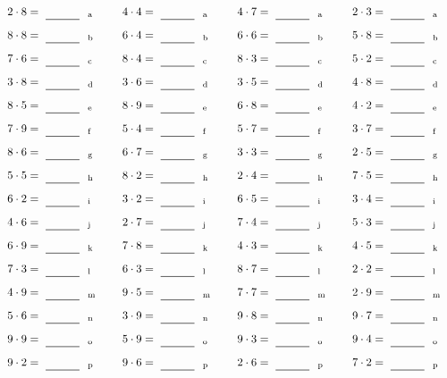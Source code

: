 \documentclass
[
  draft    = true,
  fontsize = 11pt,
  parskip  = half-
]
{scrartcl}
\begin{document}
\par\vfill\par
\begin{align*}
    \pline{2\cdot8}&=\rline{a}
  & \pline{4\cdot4}&=\rline{a}
  & \pline{4\cdot7}&=\rline{a}
  & \pline{2\cdot3}&=\rline{a} \\[1ex]
    \pline{8\cdot8}&=\rline{b}
  & \pline{6\cdot4}&=\rline{b}
  & \pline{6\cdot6}&=\rline{b}
  & \pline{5\cdot8}&=\rline{b} \\[1ex]
    \pline{7\cdot6}&=\rline{c}
  & \pline{8\cdot4}&=\rline{c}
  & \pline{8\cdot3}&=\rline{c}
  & \pline{5\cdot2}&=\rline{c} \\[1ex]
    \pline{3\cdot8}&=\rline{d}
  & \pline{3\cdot6}&=\rline{d}
  & \pline{3\cdot5}&=\rline{d}
  & \pline{4\cdot8}&=\rline{d} \\[1ex]
    \pline{8\cdot5}&=\rline{e}
  & \pline{8\cdot9}&=\rline{e}
  & \pline{6\cdot8}&=\rline{e}
  & \pline{4\cdot2}&=\rline{e} \\[1ex]
    \pline{7\cdot9}&=\rline{f}
  & \pline{5\cdot4}&=\rline{f}
  & \pline{5\cdot7}&=\rline{f}
  & \pline{3\cdot7}&=\rline{f} \\[1ex]
    \pline{8\cdot6}&=\rline{g}
  & \pline{6\cdot7}&=\rline{g}
  & \pline{3\cdot3}&=\rline{g}
  & \pline{2\cdot5}&=\rline{g} \\[1ex]
    \pline{5\cdot5}&=\rline{h}
  & \pline{8\cdot2}&=\rline{h}
  & \pline{2\cdot4}&=\rline{h}
  & \pline{7\cdot5}&=\rline{h} \\[1ex]
    \pline{6\cdot2}&=\rline{i}
  & \pline{3\cdot2}&=\rline{i}
  & \pline{6\cdot5}&=\rline{i}
  & \pline{3\cdot4}&=\rline{i} \\[1ex]
    \pline{4\cdot6}&=\rline{j}
  & \pline{2\cdot7}&=\rline{j}
  & \pline{7\cdot4}&=\rline{j}
  & \pline{5\cdot3}&=\rline{j} \\[1ex]
    \pline{6\cdot9}&=\rline{k}
  & \pline{7\cdot8}&=\rline{k}
  & \pline{4\cdot3}&=\rline{k}
  & \pline{4\cdot5}&=\rline{k} \\[1ex]
    \pline{7\cdot3}&=\rline{l}
  & \pline{6\cdot3}&=\rline{l}
  & \pline{8\cdot7}&=\rline{l}
  & \pline{2\cdot2}&=\rline{l} \\[1ex]
    \pline{4\cdot9}&=\rline{m}
  & \pline{9\cdot5}&=\rline{m}
  & \pline{7\cdot7}&=\rline{m}
  & \pline{2\cdot9}&=\rline{m} \\[1ex]
    \pline{5\cdot6}&=\rline{n}
  & \pline{3\cdot9}&=\rline{n}
  & \pline{9\cdot8}&=\rline{n}
  & \pline{9\cdot7}&=\rline{n} \\[1ex]
    \pline{9\cdot9}&=\rline{o}
  & \pline{5\cdot9}&=\rline{o}
  & \pline{9\cdot3}&=\rline{o}
  & \pline{9\cdot4}&=\rline{o} \\[1ex]
    \pline{9\cdot2}&=\rline{p}
  & \pline{9\cdot6}&=\rline{p}
  & \pline{2\cdot6}&=\rline{p}
  & \pline{7\cdot2}&=\rline{p}
\end{align*}
\end{document}
